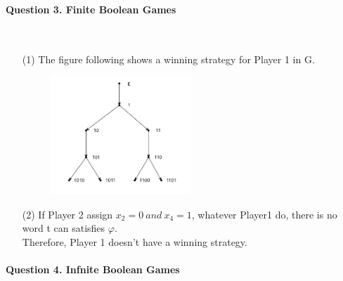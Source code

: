 \documentclass[12pt]{article}
\begin{document}
    \paragraph{Question 3. Finite Boolean Games}~{}
    \\
    \begin{enumerate}
        \item [(1)]
        The figure following shows a winning strategy for Player 1 in G. 
        \begin{figure}[htbp]
            \centering 
            \includegraphics[width=0.5\textwidth,height=0.5\textwidth]{win1.png}
        \end{figure} \par
        \item [(2)]
        If Player 2 assign $x_2 = 0\ and\ x_4=1$, whatever Player1 do, there is no word t can satisfies $\varphi$. \\
        Therefore, Player 1 doesn't have a winning strategy.
    \end{enumerate}
    
    
    \newpage
    \paragraph{Question 4. Infnite Boolean Games}~{}
    \\
    
\end{document}
